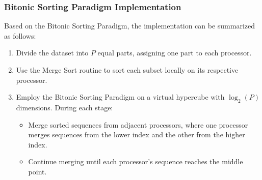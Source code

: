 \documentclass[12pt,conference]{ieeeconf} %
\begin{document}
\subsubsection{Bitonic Sorting Paradigm Implementation}
Based on the Bitonic Sorting Paradigm, the implementation can be summarized as follows:
\begin{enumerate}
    \item Divide the dataset into $P$ equal parts, assigning one part to each processor.
    \item Use the Merge Sort routine to sort each subset locally on its respective processor.
    \item Employ the Bitonic Sorting Paradigm on a virtual hypercube with  $\log_2(P)$ dimensions.
    During each stage:
    \begin{itemize}
        \item Merge sorted sequences from adjacent processors, where one processor merges sequences from the lower index and the other from the higher index.
        \item Continue merging until each processor's sequence reaches the middle point. 
    \end{itemize}
\end{enumerate}
\end{document}
